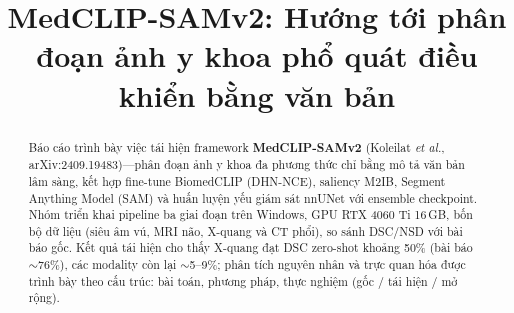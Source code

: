 \documentclass[conference]{IEEEtran}
\begin{document}
\title{MedCLIP-SAMv2: Hướng tới phân đoạn ảnh y khoa phổ quát điều khiển bằng văn bản}

\author{

    \vspace{0.5cm}


    \vspace{0.2cm}
}

\maketitle
\thispagestyle{plain}
\pagestyle{plain}

\begin{abstract}
Báo cáo trình bày việc tái hiện framework \textbf{MedCLIP-SAMv2} (Koleilat \textit{et al.}, arXiv:2409.19483)---phân đoạn ảnh y khoa đa phương thức chỉ bằng mô tả văn bản lâm sàng, kết hợp fine-tune BiomedCLIP (DHN-NCE), saliency M2IB, Segment Anything Model (SAM) và huấn luyện yếu giám sát nnUNet với ensemble checkpoint. Nhóm triển khai pipeline ba giai đoạn trên Windows, GPU RTX 4060 Ti 16\,GB, bốn bộ dữ liệu (siêu âm vú, MRI não, X-quang và CT phổi), so sánh DSC/NSD với bài báo gốc. Kết quả tái hiện cho thấy X-quang đạt DSC zero-shot khoảng 50\% (bài báo $\sim$76\%), các modality còn lại $\sim$5--9\%; phân tích nguyên nhân và trực quan hóa được trình bày theo cấu trúc: bài toán, phương pháp, thực nghiệm (gốc / tái hiện / mở rộng).
\end{abstract}
\end{document}
